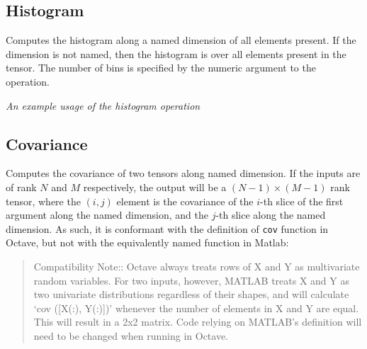 \subsection{Histogram}\label{Operation:histogram}

Computes the histogram along a named dimension of all
elements present. If the dimension is not named, then the histogram
is over all elements present in the tensor. The number of bins is
specified by the numeric argument to the operation.

\begin{center}

  {\em An example usage of the histogram operation}
\end{center}

\subsection{Covariance}\label{Operation:covariance}

Computes the covariance of two tensors along named dimension. If the
inputs are of rank $N$ and $M$ respectively, the output will be a
$(N-1)\times(M-1)$ rank tensor, where the $(i,j)$ element is the
covariance of the $i$-th slice of the first argument along the named
dimension, and the $j$-th slice along the named dimension. As such, it
is conformant with the definition of {\tt cov} function in Octave, but
not with the equivalently named function in Matlab:
\begin{quote}
     Compatibility Note:: Octave always treats rows of X and Y as
     multivariate random variables.  For two inputs, however, MATLAB
     treats X and Y as two univariate distributions regardless of their
     shapes, and will calculate ‘cov ([X(:), Y(:)])’ whenever the number
     of elements in X and Y are equal.  This will result in a 2x2
     matrix.  Code relying on MATLAB’s definition will need to be
     changed when running in Octave.
   \end{quote}


